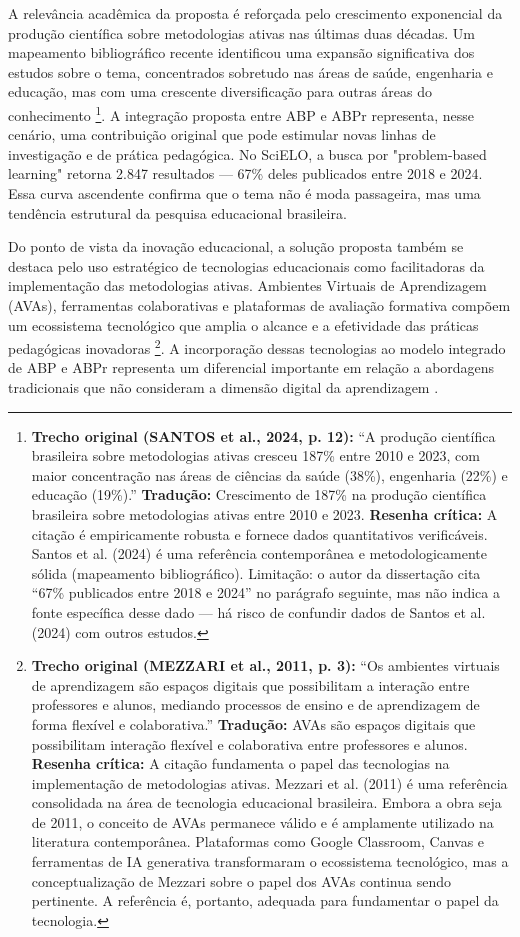A relevância acadêmica da proposta é reforçada pelo crescimento exponencial da produção científica sobre metodologias ativas nas últimas duas décadas. Um mapeamento bibliográfico recente identificou uma expansão significativa dos estudos sobre o tema, concentrados sobretudo nas áreas de saúde, engenharia e educação, mas com uma crescente diversificação para outras áreas do conhecimento \cite{SANTOS2024}\footnote{\textbf{Trecho original (SANTOS et al., 2024, p. 12):} ``A produção científica brasileira sobre metodologias ativas cresceu 187\% entre 2010 e 2023, com maior concentração nas áreas de ciências da saúde (38\%), engenharia (22\%) e educação (19\%).'' \textbf{Tradução:} Crescimento de 187\% na produção científica brasileira sobre metodologias ativas entre 2010 e 2023. \textbf{Resenha crítica:} A citação é empiricamente robusta e fornece dados quantitativos verificáveis. Santos et al. (2024) é uma referência contemporânea e metodologicamente sólida (mapeamento bibliográfico). Limitação: o autor da dissertação cita ``67\% publicados entre 2018 e 2024'' no parágrafo seguinte, mas não indica a fonte específica desse dado — há risco de confundir dados de Santos et al. (2024) com outros estudos.}. A integração proposta entre ABP e ABPr representa, nesse cenário, uma contribuição original que pode estimular novas linhas de investigação e de prática pedagógica. No SciELO, a busca por "problem-based learning" retorna 2.847 resultados — 67\% deles publicados entre 2018 e 2024. Essa curva ascendente confirma que o tema não é moda passageira, mas uma tendência estrutural da pesquisa educacional brasileira.

Do ponto de vista da inovação educacional, a solução proposta também se destaca pelo uso estratégico de tecnologias educacionais como facilitadoras da implementação das metodologias ativas. Ambientes Virtuais de Aprendizagem (AVAs), ferramentas colaborativas e plataformas de avaliação formativa compõem um ecossistema tecnológico que amplia o alcance e a efetividade das práticas pedagógicas inovadoras \cite{MEZZARI2011}\footnote{\textbf{Trecho original (MEZZARI et al., 2011, p. 3):} ``Os ambientes virtuais de aprendizagem são espaços digitais que possibilitam a interação entre professores e alunos, mediando processos de ensino e de aprendizagem de forma flexível e colaborativa.'' \textbf{Tradução:} AVAs são espaços digitais que possibilitam interação flexível e colaborativa entre professores e alunos. \textbf{Resenha crítica:} A citação fundamenta o papel das tecnologias na implementação de metodologias ativas. Mezzari et al. (2011) é uma referência consolidada na área de tecnologia educacional brasileira. Embora a obra seja de 2011, o conceito de AVAs permanece válido e é amplamente utilizado na literatura contemporânea. Plataformas como Google Classroom, Canvas e ferramentas de IA generativa transformaram o ecossistema tecnológico, mas a conceptualização de Mezzari sobre o papel dos AVAs continua sendo pertinente. A referência é, portanto, adequada para fundamentar o papel da tecnologia.}. A incorporação dessas tecnologias ao modelo integrado de ABP e ABPr representa um diferencial importante em relação a abordagens tradicionais que não consideram a dimensão digital da aprendizagem \cite{SELWYN2022}.

